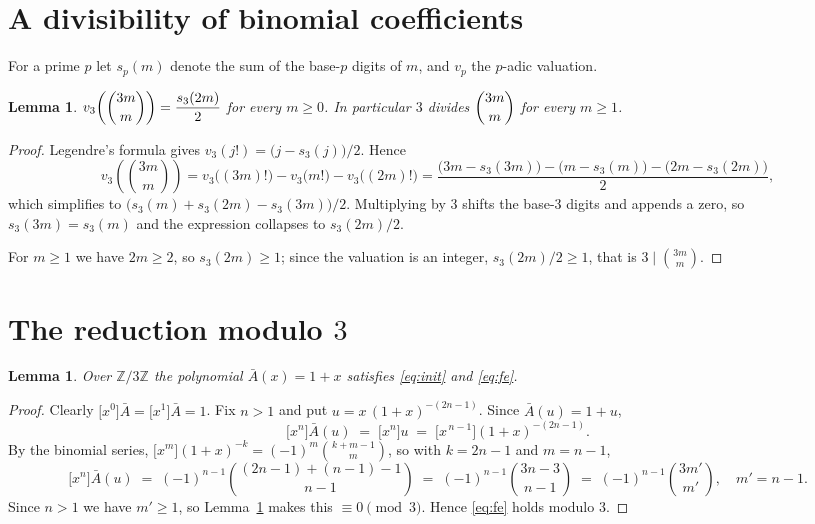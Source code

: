 \documentclass[11pt,a4paper]{article}
\theoremstyle{plain}
\newtheorem{lemma}[theorem]{Lemma}
\theoremstyle{definition}
\begin{document}
\section{A divisibility of binomial coefficients}

For a prime $p$ let $s_p(m)$ denote the sum of the base-$p$ digits of $m$, and $v_p$ the
$p$-adic valuation.

\begin{lemma}\label{lem:val}
$v_3\!\left(\dbinom{3m}{m}\right)=\dfrac{s_3(2m)}{2}$ for every $m\ge0$. In
particular $3$ divides $\dbinom{3m}{m}$ for every $m\ge1$.
\end{lemma}

\begin{proof}
Legendre's formula gives $v_3(j!)=\bigl(j-s_3(j)\bigr)/2$. Hence
\[
v_3\!\left(\binom{3m}{m}\right)
=v_3\bigl((3m)!\bigr)-v_3\bigl(m!\bigr)-v_3\bigl((2m)!\bigr)
=\frac{\bigl(3m-s_3(3m)\bigr)-\bigl(m-s_3(m)\bigr)-\bigl(2m-s_3(2m)\bigr)}{2},
\]
which simplifies to $\bigl(s_3(m)+s_3(2m)-s_3(3m)\bigr)/2$. Multiplying by $3$ shifts the
base-$3$ digits and appends a zero, so $s_3(3m)=s_3(m)$ and the expression collapses to
$s_3(2m)/2$.

For $m\ge1$ we have $2m\ge2$, so $s_3(2m)\ge1$; since the valuation is an integer,
$s_3(2m)/2\ge1$, that is $3\mid\binom{3m}{m}$.
\end{proof}

\section{The reduction modulo $3$}

\begin{lemma}\label{lem:sat}
Over $\mathbb{Z}/3\mathbb{Z}$ the polynomial $\bar A(x)=1+x$ satisfies \eqref{eq:init} and
\eqref{eq:fe}.
\end{lemma}

\begin{proof}
Clearly $\bigl[x^{0}\bigr]\bar A=\bigl[x^{1}\bigr]\bar A=1$. Fix $n>1$ and put
$u=x\,(1+x)^{-(2n-1)}$. Since $\bar A(u)=1+u$,
\[
\bigl[x^{n}\bigr]\bar A(u)\;=\;\bigl[x^{n}\bigr]u
\;=\;\bigl[x^{\,n-1}\bigr](1+x)^{-(2n-1)} .
\]
By the binomial series, $\bigl[x^{m}\bigr](1+x)^{-k}=(-1)^{m}\binom{k+m-1}{m}$, so with
$k=2n-1$ and $m=n-1$,
\[
\bigl[x^{n}\bigr]\bar A(u)\;=\;(-1)^{n-1}\binom{(2n-1)+(n-1)-1}{n-1}
\;=\;(-1)^{n-1}\binom{3n-3}{n-1}
\;=\;(-1)^{n-1}\binom{3m'}{m'},\quad m'=n-1 .
\]
Since $n>1$ we have $m'\ge1$, so Lemma~\ref{lem:val} makes this $\equiv0\pmod3$. Hence
\eqref{eq:fe} holds modulo $3$.
\end{proof}
\end{document}
